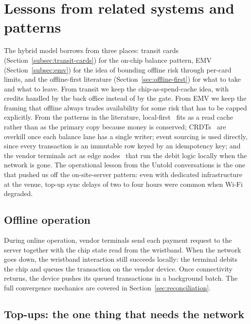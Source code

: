 \section{Lessons from related systems and patterns}
\label{sec:why-architecture}

The hybrid model borrows from three places: transit cards (Section~\ref{subsec:transit-cards}) for the on-chip balance pattern, EMV (Section~\ref{subsec:emv}) for the idea of bounding offline risk through per-card limits, and the offline-first literature (Section~\ref{sec:offline-first}) for what to take and what to leave. From transit we keep the chip-as-spend-cache idea, with credits handled by the back office instead of by the gate. From EMV we keep the framing that offline always trades availability for some risk that has to be capped explicitly. From the patterns in the literature, local-first~\cite{Kleppmann2019} fits as a read cache rather than as the primary copy because money is conserved; CRDTs~\cite{Shapiro2011} are overkill once each balance lane has a single writer; event sourcing is used directly, since every transaction is an immutable row keyed by an idempotency key; and the vendor terminals act as edge nodes~\cite{Shi2016} that run the debit logic locally when the network is gone. The operational lesson from the Untold conversations is the one that pushed us off the on-site-server pattern: even with dedicated infrastructure at the venue, top-up sync delays of two to four hours were common when Wi-Fi degraded.

\subsection{Offline operation}
\label{subsec:offline-operation}

During online operation, vendor terminals send each payment request to the server together with the chip state read from the wristband. When the network goes down, the wristband interaction still succeeds locally: the terminal debits the chip and queues the transaction on the vendor device. Once connectivity returns, the device pushes its queued transactions in a background batch. The full convergence mechanics are covered in Section~\ref{sec:reconciliation}.

\subsection{Top-ups: the one thing that needs the network}
\label{subsec:topups}

